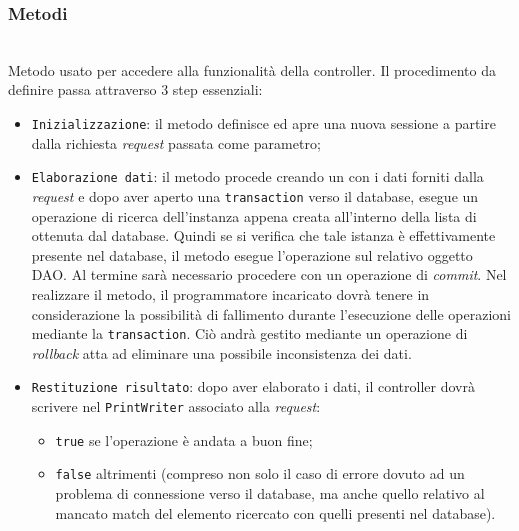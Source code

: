 \subsubsection*{Metodi}
\begin{description}

\item{}\\
	Metodo usato per accedere alla funzionalità della controller. Il procedimento da definire passa attraverso 3 step essenziali:
	\begin{itemize}
		\item \texttt{Inizializzazione}: il metodo definisce ed apre una nuova sessione a partire dalla richiesta \textit{request} passata come parametro;
		\item \texttt{Elaborazione dati}: il metodo procede creando un  con i dati forniti dalla \textit{request} e dopo aver aperto una \texttt{transaction} verso il database, esegue un operazione di ricerca dell'instanza appena creata all'interno della lista di  ottenuta dal database. Quindi se si verifica che tale istanza è effettivamente presente nel database, il metodo esegue l'operazione  sul relativo oggetto DAO. Al termine sarà necessario procedere con un operazione di \textit{commit}. Nel realizzare il metodo, il programmatore incaricato dovrà tenere in considerazione la possibilità di fallimento durante l'esecuzione delle operazioni mediante la \texttt{transaction}. Ciò andrà gestito mediante un operazione di \textit{rollback} atta ad eliminare una possibile inconsistenza dei dati.
		\item \texttt{Restituzione risultato}: dopo aver elaborato i dati, il controller dovrà scrivere nel \texttt{PrintWriter} associato alla \textit{request}:
			\begin{itemize}
				\item \texttt{true} se l'operazione è andata a buon fine;
				\item \texttt{false} altrimenti (compreso non solo il caso di errore dovuto ad un problema di connessione verso il database, ma anche quello relativo al mancato match del elemento ricercato con quelli presenti nel database).
			\end{itemize}
	\end{itemize}

\end{description}

